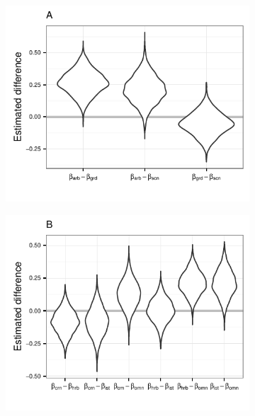 \documentclass[12pt,letterpaper]{article}
\begin{document}
\begin{figure}[ht]
  \centering
  \begin{subfigure}[b]{0.4\textwidth}
    \caption{}
    \includegraphics[height = 0.5\textheight, width = \textwidth, keepaspectratio = true]{figure/loco_diff_est}
    \label{subfig:loco}
  \end{subfigure}
  \begin{subfigure}[b]{0.4\textwidth}
    \caption{}
    \includegraphics[height = 0.5\textheight, width = \textwidth, keepaspectratio = true]{figure/diet_diff_est}
    \label{subfig:diet}
  \end{subfigure}

\end{figure}
\end{document}
